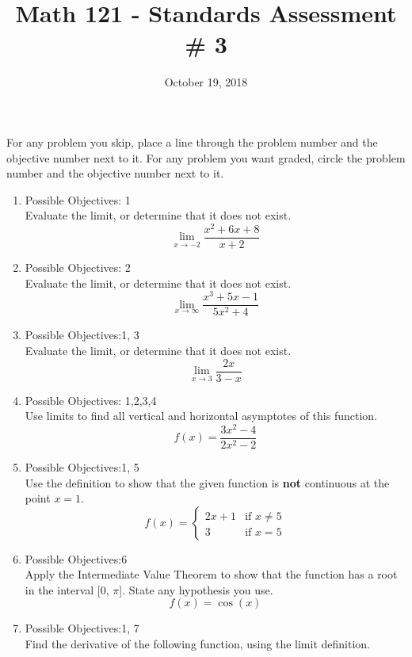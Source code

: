\documentclass{exam}
\title{Math 121 - Standards Assessment \# 3}
\date{October 19, 2018}
\begin{document}
\maketitle
\bigskip

\begin{center}
\large
    For any problem you skip, place a line through the problem number and the objective number next to it. For any problem you want graded, circle the problem number and the objective number next to it.
\end{center}
\normalsize

\begin{enumerate}
\item Possible Objectives: 1\\
Evaluate the limit, or determine that it does not exist.
$$\lim_{x \rightarrow -2} \frac{x^2 + 6x + 8}{x+2}$$
\item Possible Objectives: 2\\
Evaluate the limit, or determine that it does not exist.
$$\lim_{x\rightarrow \infty} \frac{x^3 + 5x - 1}{5x^2 +4}$$
\item Possible Objectives:1, 3\\
Evaluate the limit, or determine that it does not exist.
$$\lim_{x \rightarrow 3}  \frac{2x}{3-x}$$
\item Possible Objectives: 1,2,3,4\\
Use limits to find all vertical and horizontal asymptotes of this function.
$$f(x) = \frac{3x^2 -4}{2x^2 - 2}$$
\item Possible Objectives:1, 5\\
Use the definition to show that the given function is \textbf{not} continuous at the point $x = 1$.
$$f(x) = \left\{ \begin{array}{rl} 2x+1 & \mbox{if } x \neq 5 \\ 3 & \mbox{if } x = 5\end{array}\right.$$
\item Possible Objectives:6\\
Apply the Intermediate Value Theorem to show that the function has a root in the interval [0, $\pi$]. State any hypothesis you use.
$$f(x) = \cos(x)$$
\item Possible Objectives:1, 7\\
Find the derivative of the following function, using the limit definition.

\end{enumerate}
\end{document}
